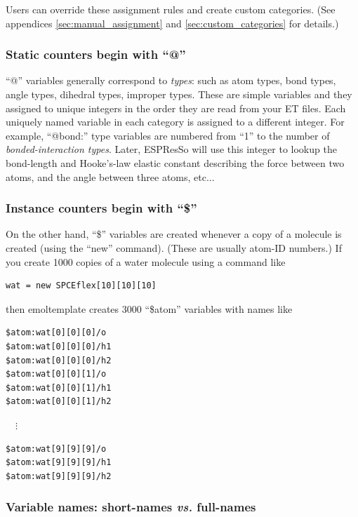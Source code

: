 \documentclass[11pt]{article}
\begin{document}
Users can override these assignment rules and create custom categories.
(See appendices \ref{sec:manual_assignment} and \ref{sec:custom_categories}
for details.)

\subsubsection{Static counters begin with ``@''}
\label{sec:static_variables}

``@'' variables generally correspond to \textit{types}: 
such as atom types, bond types, angle types, dihedral types, improper types.
These are simple variables and they assigned to unique integers in the 
order they are read from your ET files.
Each uniquely named variable in each category is assigned to a different 
integer.  For example, ``@bond:'' type variables are numbered from ``1''
to the number of \textit{bonded-interaction types}.
Later, ESPResSo will use this integer to lookup the bond-length and Hooke's-law 
elastic constant describing the force between two atoms, and the
angle between three atoms, etc...


\subsubsection{Instance counters begin with ``\$''}
\label{sec:instance_variables}

On the other hand, ``\$'' variables are created whenever a copy 
of a molecule is created (using the ``new'' command).  
(These are usually atom-ID numbers.)
If you create 1000 copies of a water molecule using a command like 
\begin{verbatim}
wat = new SPCEflex[10][10][10]
\end{verbatim}
then emoltemplate creates 3000 ``\$atom'' variables with names like
\begin{verbatim}
$atom:wat[0][0][0]/o
$atom:wat[0][0][0]/h1
$atom:wat[0][0][0]/h2
$atom:wat[0][0][1]/o
$atom:wat[0][0][1]/h1
$atom:wat[0][0][1]/h2
\end{verbatim}
$\quad \vdots $
\begin{verbatim}
$atom:wat[9][9][9]/o
$atom:wat[9][9][9]/h1
$atom:wat[9][9][9]/h2
\end{verbatim}



\subsubsection{Variable names: short-names \textit{vs.} full-names}
\label{sec:full_names}
\end{document}
